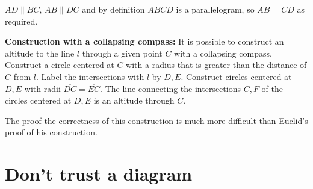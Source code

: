 $\overline{AD}\|\overline{BC}$, $\overline{AB}\|\overline{DC}$ and by definition $\overline{ABCD}$ is a parallelogram, so $\overline{AB}= \overline{CD}$ as required.

\textbf{Construction with a collapsing compass:} It is possible to construct an altitude to the line $l$ through a given point $C$ with a collapsing compass. Construct a circle centered at $C$ with a radius that is greater than the distance of $C$ from $l$. Label the intersections with $l$ by $D,E$. Construct circles centered at $D,E$ with radii $\overline{DC} = \overline{EC}$. The line connecting the intersections $C,F$ of the circles centered at $D,E$  is an altitude through $C$.
\begin{center}
\end{center}
The proof the correctness of this construction is much more difficult than Euclid's proof of his construction.


\section{Don't trust a diagram}

